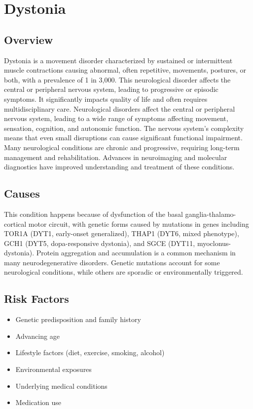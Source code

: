 \chapter{Dystonia}
\label{sec:Dystonia}

\section{Overview}
Dystonia is a movement disorder characterized by sustained or intermittent muscle contractions causing abnormal, often repetitive, movements, postures, or both, with a prevalence of 1 in 3,000. This neurological disorder affects the central or peripheral nervous system, leading to progressive or episodic symptoms. It significantly impacts quality of life and often requires multidisciplinary care. Neurological disorders affect the central or peripheral nervous system, leading to a wide range of symptoms affecting movement, sensation, cognition, and autonomic function. The nervous system's complexity means that even small disruptions can cause significant functional impairment. Many neurological conditions are chronic and progressive, requiring long-term management and rehabilitation. Advances in neuroimaging and molecular diagnostics have improved understanding and treatment of these conditions.
\section{Causes}
This condition happens because of dysfunction of the basal ganglia-thalamo-cortical motor circuit, with genetic forms caused by mutations in genes including TOR1A (DYT1, early-onset generalized), THAP1 (DYT6, mixed phenotype), GCH1 (DYT5, dopa-responsive dystonia), and SGCE (DYT11, myoclonus-dystonia).    Protein aggregation and accumulation is a common mechanism in many neurodegenerative disorders.  Genetic mutations account for some neurological conditions, while others are sporadic or environmentally triggered.   
\section{Risk Factors}
\begin{itemize}[noitemsep]
  \item Genetic predisposition and family history
  \item Advancing age
  \item Lifestyle factors (diet, exercise, smoking, alcohol)
  \item Environmental exposures
  \item Underlying medical conditions
  \item Medication use
\end{itemize}
